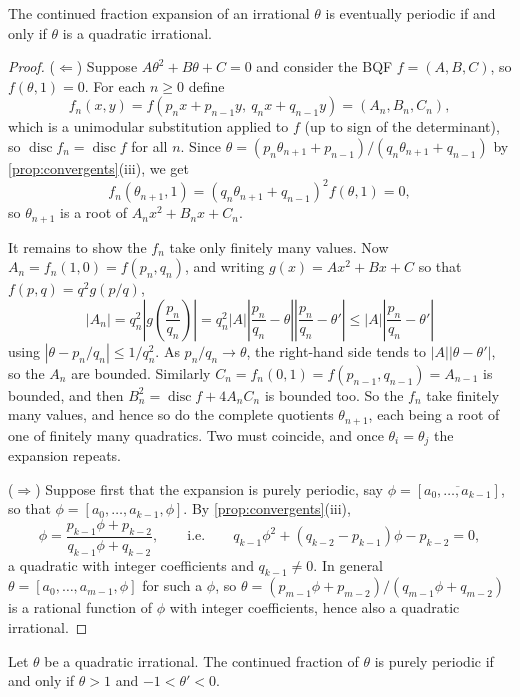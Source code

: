 \documentclass[a4paper]{scrartcl}
\DeclareMathOperator{\disc}{disc}
\begin{document}
\begin{theorem}[Lagrange]\label{thm:lagrangecf}
	The continued fraction expansion of an irrational $\theta$ is eventually periodic if and only if $\theta$ is a quadratic irrational.
\end{theorem}
\begin{proof}
	($\Leftarrow$) Suppose $A\theta^2 + B\theta + C = 0$ and consider the BQF $f = (A, B, C)$, so $f(\theta, 1) = 0$. For each $n \geq 0$ define
	$$
	f_n(x,y) = f(p_nx + p_{n-1}y, \ q_nx+q_{n-1}y) = (A_n, B_n, C_n),
	$$
	which is a unimodular substitution applied to $f$ (up to sign of the determinant), so $\disc f_n = \disc f$ for all $n$. Since $\theta = (p_n\theta_{n+1}+p_{n-1})/(q_n\theta_{n+1}+q_{n-1})$ by \autoref{prop:convergents}(iii), we get
	$$
	f_n(\theta_{n+1}, 1) = (q_n\theta_{n+1}+q_{n-1})^2 f(\theta, 1) = 0,
	$$
	so $\theta_{n+1}$ is a root of $A_nx^2 + B_nx + C_n$.

	It remains to show the $f_n$ take only finitely many values. Now $A_n = f_n(1,0) = f(p_n, q_n)$, and writing $g(x) = Ax^2+Bx+C$ so that $f(p,q) = q^2g(p/q)$,
	$$
	|A_n| = q_n^2\left|g\!\left(\frac{p_n}{q_n}\right)\right| = q_n^2|A|\left|\frac{p_n}{q_n} - \theta\right|\left|\frac{p_n}{q_n}-\theta'\right| \leq |A|\left|\frac{p_n}{q_n} - \theta'\right|
	$$
	using $|\theta - p_n/q_n| \leq 1/q_n^2$. As $p_n/q_n \to \theta$, the right-hand side tends to $|A||\theta - \theta'|$, so the $A_n$ are bounded. Similarly $C_n = f_n(0,1) = f(p_{n-1}, q_{n-1}) = A_{n-1}$ is bounded, and then $B_n^2 = \disc f + 4A_nC_n$ is bounded too. So the $f_n$ take finitely many values, and hence so do the complete quotients $\theta_{n+1}$, each being a root of one of finitely many quadratics. Two must coincide, and once $\theta_i = \theta_j$ the expansion repeats.

	($\Rightarrow$) Suppose first that the expansion is purely periodic, say $\phi = [\overline{a_0, \dots, a_{k-1}}]$, so that $\phi = [a_0, \dots, a_{k-1}, \phi]$. By \autoref{prop:convergents}(iii),
	$$
	\phi = \frac{p_{k-1}\phi + p_{k-2}}{q_{k-1}\phi+q_{k-2}}, \qquad \text{i.e.} \qquad q_{k-1}\phi^2 + (q_{k-2} - p_{k-1})\phi - p_{k-2} = 0,
	$$
	a quadratic with integer coefficients and $q_{k-1} \neq 0$. In general $\theta = [a_0, \dots, a_{m-1}, \phi]$ for such a $\phi$, so $\theta = (p_{m-1}\phi + p_{m-2})/(q_{m-1}\phi+q_{m-2})$ is a rational function of $\phi$ with integer coefficients, hence also a quadratic irrational.
\end{proof}

\begin{theorem}[Galois]\label{nt-thm:galois}
	Let $\theta$ be a quadratic irrational. The continued fraction of $\theta$ is purely periodic if and only if $\theta > 1$ and $-1 < \theta' < 0$.
\end{theorem}
\end{document}
